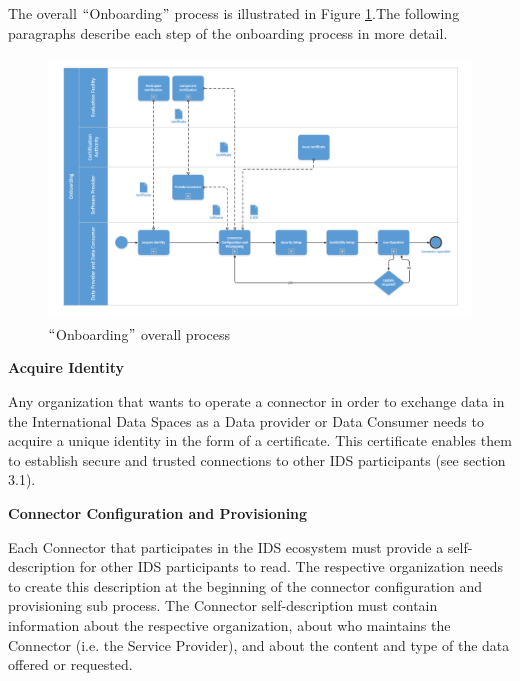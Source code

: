 The overall $``$Onboarding$"$  process is illustrated in Figure \ref{fig:_Overall_onboarding_process}.The following paragraphs describe each step of the onboarding process in more detail.


\begin{figure}[H]
	\begin{Center}
		\includegraphics[width=6.53in,height=2.74in]{./media/image22.PNG}
		\caption{ $``$Onboarding$"$  overall process}
		\label{fig:_Overall_onboarding_process}
	\end{Center}
\end{figure}




\textbf{Acquire Identity}

Any organization that wants to operate a connector in order to exchange data in the International Data Spaces as a Data provider or Data Consumer needs to acquire a unique identity in the form of a certificate. This certificate enables them to establish secure and trusted connections to other IDS participants (see section 3.1).


\textbf{Connector Configuration and Provisioning}

Each Connector that participates in the IDS ecosystem must provide a self-description for other IDS participants to read. The respective organization needs to create this description at the beginning of the connector configuration and provisioning sub process. The Connector self-description must contain information about the respective organization, about who maintains the Connector (i.e. the Service Provider), and about the content and type of the data offered or requested.

